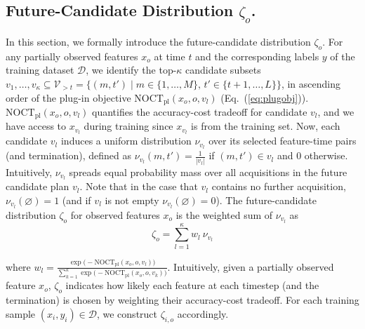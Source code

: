 \subsection{Future-Candidate Distribution $\zeta_o$.}
\label{appendex:future_dist}
In this section, we formally introduce the future-candidate distribution $\zeta_o$. For any partially observed features $x_o$ at time $t$ and the corresponding labels $y$ of the training dataset $\mathcal{D}$, we identify the top-$\kappa$ candidate subsets $v_1, \ldots, v_\kappa \subseteq \mathcal{V}_{>t}
= \{(m, t') \mid m \in \{1, \ldots, M\}, \, t' \in \{t+1, \ldots, L\}\}$, in ascending order of the plug-in objective $\mathrm{NOCT}_{\mathrm{pl}}(x_o, o, v_l)$ (Eq.~(\ref{eq:plugobj})).
$\mathrm{NOCT}_{\mathrm{pl}}(x_o, o, v_l)$ quantifies the accuracy-cost tradeoff for candidate $v_l$, and we have access to $x_{v_l}$ during training since $x_{v_l}$ is from the training set. Now, each candidate $v_l$ induces a uniform distribution $\nu_{v_l}$ over its selected feature-time pairs (and termination), defined as $\nu_{v_l}(m,t') = \tfrac{1}{|v_l|}$ if $(m,t') \in v_l$ and $0$ otherwise. Intuitively, $\nu_{v_l}$ spreads equal probability mass over all acquisitions in the future candidate plan $v_l$. Note that in the case that $v_l$ contains no further acquisition, $\nu_{v_l}(\varnothing) = 1$ (and if $v_l$ is not empty $\nu_{v_l}(\varnothing) = 0$). The future-candidate distribution $\zeta_o$ for observed features $x_o$ is the weighted sum of $\nu_{v_l}$ as  
\begin{equation}
\zeta_o = \sum_{l=1}^{\kappa} w_l \ \nu_{v_l}
\label{eq:prob}
\end{equation}

where $w_l = \frac{\exp\!\big(-\mathrm{NOCT}_{\mathrm{pl}}(x_o,o,v_l)\big)}{\sum_{k=1}^\kappa \exp\!\big(-\mathrm{NOCT}_{\mathrm{pl}}(x_o,o,v_k)\big)}$. Intuitively, given a partially observed feature $x_o$, $\zeta_o$ indicates how likely each feature at each timestep (and the termination) is chosen by weighting their accuracy-cost
tradeoff. For each training sample $(x_i, y_i) \in \mathcal{D}$, we construct $\zeta_{i,o}$ accordingly.


